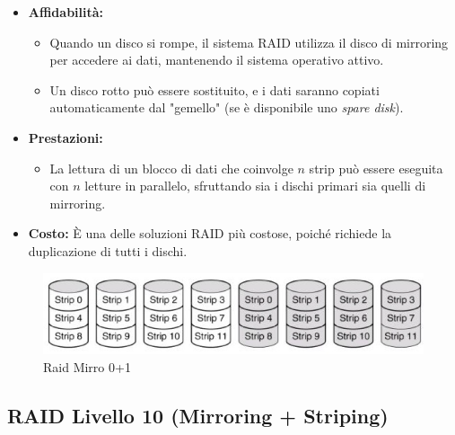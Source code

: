 \begin{itemize}
    \item \textbf{Affidabilità:} 
    \begin{itemize}
        \item Quando un disco si rompe, il sistema RAID utilizza il disco di mirroring per accedere ai dati, mantenendo il sistema operativo attivo.
        \item Un disco rotto può essere sostituito, e i dati saranno copiati automaticamente dal "gemello" (se è disponibile uno \textit{spare disk}).
    \end{itemize}
    \item \textbf{Prestazioni:}
    \begin{itemize}
        \item La lettura di un blocco di dati che coinvolge $n$ strip può essere eseguita con $n$ letture in parallelo, sfruttando sia i dischi primari sia quelli di mirroring.
    \end{itemize}
    \item \textbf{Costo:} È una delle soluzioni RAID più costose, poiché richiede la duplicazione di tutti i dischi.
\end{itemize}

\begin{figure}[h] \centering \includegraphics[width=0.50\linewidth]{images/raid_mirror01.png} \caption{Raid Mirro 0+1} \end{figure}


\subsection{RAID Livello 10 (Mirroring + Striping)}


